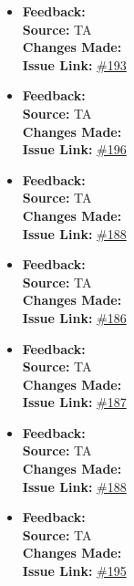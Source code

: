 \documentclass{article}
\begin{document}
\begin{itemize}
  \item 
    \textbf{Feedback:}  \\
    \textbf{Source:} TA \\
    \textbf{Changes Made:} \\
    \textbf{Issue Link:} \href{https://github.com/parishanizam/TeleHealth/issues/193}{\#193}

  \item 
    \textbf{Feedback:}  \\
    \textbf{Source:} TA \\
    \textbf{Changes Made:} \\
    \textbf{Issue Link:} \href{https://github.com/parishanizam/TeleHealth/issues/196}{\#196}

  \item 
    \textbf{Feedback:}  \\
    \textbf{Source:} TA \\
    \textbf{Changes Made:} \\
    \textbf{Issue Link:} \href{https://github.com/parishanizam/TeleHealth/issues/188}{\#188}

  \item 
    \textbf{Feedback:}  \\
    \textbf{Source:} TA \\
    \textbf{Changes Made:} \\
    \textbf{Issue Link:} \href{https://github.com/parishanizam/TeleHealth/issues/186}{\#186}

  \item 
    \textbf{Feedback:}  \\
    \textbf{Source:} TA \\
    \textbf{Changes Made:} \\
    \textbf{Issue Link:} \href{https://github.com/parishanizam/TeleHealth/issues/187}{\#187}

  \item 
    \textbf{Feedback:}  \\
    \textbf{Source:} TA \\
    \textbf{Changes Made:} \\
    \textbf{Issue Link:} \href{https://github.com/parishanizam/TeleHealth/issues/188}{\#188}

  \item 
    \textbf{Feedback:}  \\
    \textbf{Source:} TA \\
    \textbf{Changes Made:} \\
    \textbf{Issue Link:} \href{https://github.com/parishanizam/TeleHealth/issues/195}{\#195}


\end{itemize}
\end{document}
